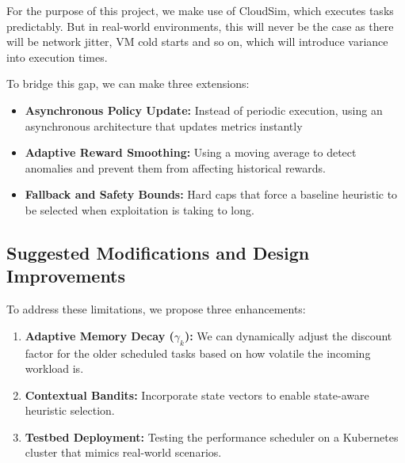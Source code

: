 For the purpose of this project, we make use of CloudSim, which executes tasks predictably. But in real-world environments, this will never be the case as there will be network jitter, VM cold starts and so on, which will introduce variance into execution times.

To bridge this gap, we can make three extensions:

\begin{itemize}
    \item \textbf{Asynchronous Policy Update:} Instead of periodic execution, using an asynchronous architecture that updates metrics instantly
    \item \textbf{Adaptive Reward Smoothing:} Using a moving average to detect anomalies and prevent them from affecting historical rewards.
    \item \textbf{Fallback and Safety Bounds:} Hard caps that force a baseline heuristic to be selected when exploitation is taking to long.
\end{itemize}



\subsection{Suggested Modifications and Design Improvements}
To address these limitations, we propose three enhancements:
\begin{enumerate}
    \item \textbf{Adaptive Memory Decay ($\gamma_k$):} We can dynamically adjust the discount factor for the older scheduled tasks based on how volatile the incoming workload is.
    \item \textbf{Contextual Bandits:} Incorporate state vectors to enable state-aware heuristic selection.
    \item \textbf{Testbed Deployment:} Testing the performance scheduler on a Kubernetes cluster that mimics real-world scenarios.
\end{enumerate}